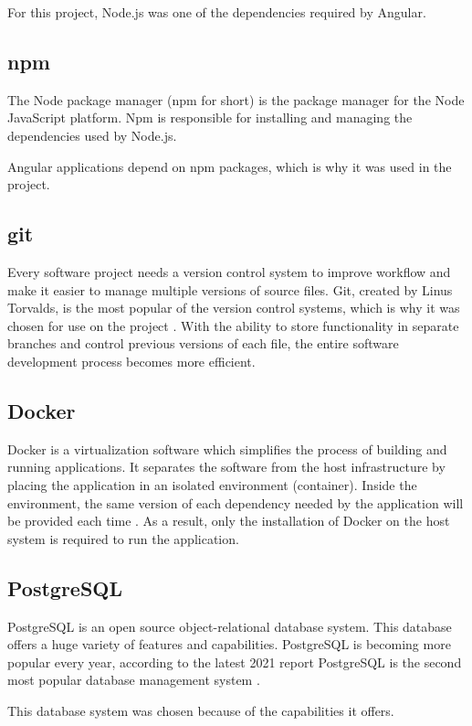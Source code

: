 \documentclass[a4paper,twoside,12pt]{book}
\begin{document}
For this project, Node.js was one of the dependencies required by Angular.

\subsection{npm}
The Node package manager (npm for short) is the package manager for the Node JavaScript platform. Npm is responsible for installing and managing the dependencies used by Node.js.

Angular applications depend on npm packages, which is why it was used in the project.

\subsection{git}
Every software project needs a version control system to improve workflow and make it easier to manage multiple versions of source files. Git, created by Linus Torvalds, is the most popular of the version control systems, which is why it was chosen for use on the project \cite{bib:stackSurvey}. With the ability to store functionality in separate branches and control previous versions of each file, the entire software development process becomes more efficient.

\subsection{Docker}
Docker is a virtualization software which simplifies the process of building and running applications. It separates the software from the host infrastructure by placing the application in an isolated environment (container). Inside the environment, the same version of each dependency needed by the application will be provided each time \cite{bib:dockerOverview}. As a result, only the installation of Docker on the host system is required to run the application.

\subsection{PostgreSQL}
PostgreSQL is an open source object-relational database system. This database offers a huge variety of features and capabilities. PostgreSQL is becoming more popular every year, according to the latest 2021 report PostgreSQL is the second most popular database management system \cite{bib:stackSurvey}.

This database system was chosen because of the capabilities it offers.
\end{document}
